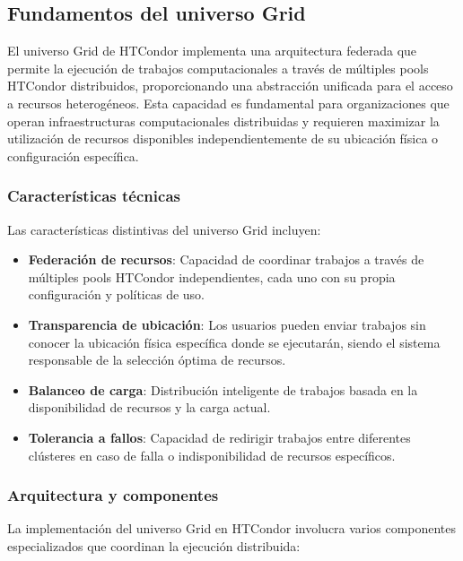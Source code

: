 \subsection{Fundamentos del universo Grid}
\noindent

El universo Grid de HTCondor implementa una arquitectura federada que permite la ejecución de trabajos computacionales a través de múltiples pools HTCondor distribuidos, proporcionando una abstracción unificada para el acceso a recursos heterogéneos. Esta capacidad es fundamental para organizaciones que operan infraestructuras computacionales distribuidas y requieren maximizar la utilización de recursos disponibles independientemente de su ubicación física o configuración específica.

\subsubsection{Características técnicas}
\noindent

Las características distintivas del universo Grid incluyen:

\begin{itemize}
	\item \textbf{Federación de recursos}: Capacidad de coordinar trabajos a través de múltiples pools HTCondor independientes, cada uno con su propia configuración y políticas de uso.
	
	\item \textbf{Transparencia de ubicación}: Los usuarios pueden enviar trabajos sin conocer la ubicación física específica donde se ejecutarán, siendo el sistema responsable de la selección óptima de recursos.
	
	\item \textbf{Balanceo de carga}: Distribución inteligente de trabajos basada en la disponibilidad de recursos y la carga actual.
	
	\item \textbf{Tolerancia a fallos}: Capacidad de redirigir trabajos entre diferentes clústeres en caso de falla o indisponibilidad de recursos específicos.
\end{itemize}

\subsubsection{Arquitectura y componentes}
\noindent

La implementación del universo Grid en HTCondor involucra varios componentes especializados que coordinan la ejecución distribuida:

